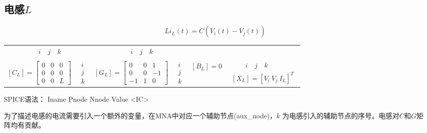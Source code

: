 \documentclass[12pt]{article}
\begin{document}
\subsection{电感$L$}
\begin{equation*}
  L\dot{i_L}(t)=C\left(\dot{V_i}(t)-\dot{V_j}(t)\right)
\end{equation*}
\begin{table}[H]
  \centering
  \renewcommand\arraystretch{0.5}
  \begin{tabular}{cccccc}
  $ \qquad \quad i \quad j \quad k$ & & $ \qquad \quad i \quad j \quad k$ & & & \\                            \\
  $\left[C_L\right]=\left[\begin{array}{ccc} 0 & 0 & 0\\ 0 & 0 & 0\\ 0 & 0 & L \end{array}\right]$  & 
  $\begin{array}{c} i \\ j \\ k \end{array}$& 
  $\left[G_L\right]=\left[\begin{array}{ccc} 0 & 0 & 1\\ 0 & 0 & -1\\ -1 & 1 & 0 \end{array}\right]$  & 
  $\begin{array}{c} i \\ j \\ k \end{array}$ & 
  $\left[B_L\right]=0$ & 
  $\begin{array}{c} \qquad i \quad j \quad k \\ \left[X_L\right]=\left[ V_i \ V_j \ I_L \right]^T\end{array}$ \\
  \end{tabular}
\end{table}
\qquad SPICE语法： Iname Pnode Nnode Value <IC>\par
\qquad 为了描述电感的电流需要引入一个额外的变量，在MNA中对应一个辅助节点(aux\_node)，$k$ 为电感引入的辅助节点的序号。电感对$C$和$G$矩阵均有贡献。\par
\end{document}
